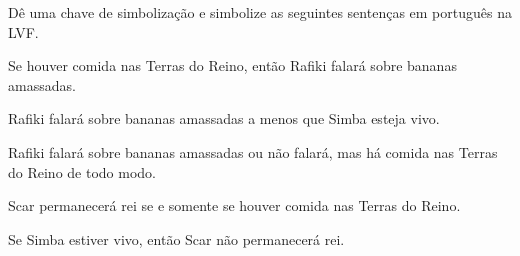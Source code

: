 \problempart Dê uma chave de simbolização e simbolize as seguintes sentenças em português na LVF.
\begin{compactlist}
\item Se houver comida nas Terras do Reino, então Rafiki falará sobre bananas amassadas.
\item[] 
\item Rafiki falará sobre bananas amassadas a menos que Simba esteja vivo.
\item[] 
\item Rafiki falará sobre bananas amassadas ou não falará, mas há comida nas Terras do Reino de todo modo.
\item[] 
\item Scar permanecerá rei se e somente se houver comida nas Terras do Reino.
\item[] 
\item Se Simba estiver vivo, então Scar não permanecerá rei.
\item[] 
\end{compactlist}


